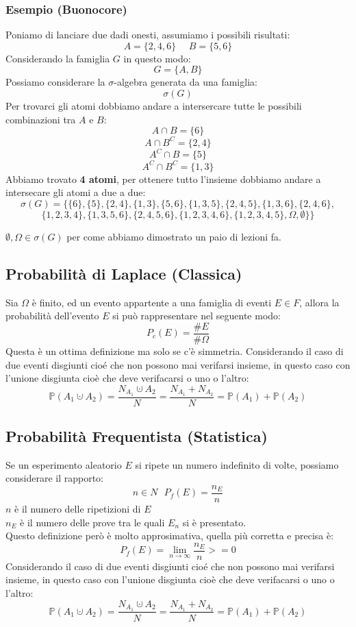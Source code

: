 \subsubsection{Esempio (Buonocore)}
Poniamo di lanciare due dadi onesti, assumiamo i possibili risultati:
$$ A = \{2,4,6\} \:\:\:\:\:\: B=\{5,6\}$$
Considerando la famiglia $G$ in questo modo:
$$ G = \{A,B\}$$
Possiamo considerare la $\sigma$-algebra generata da una famiglia:
$$ \sigma(G)$$
Per trovarci gli atomi dobbiamo andare a intersercare tutte le possibili combinazioni tra $A$ e $B$:\\
$$ A \cap B = \{6\}$$
$$ A \cap B^C = \{2,4\}$$
$$ A^C \cap B = \{5\}$$
$$ A^C \cap B^C = \{1,3\}$$
Abbiamo trovato \textbf{4 atomi}, per ottenere tutto l'insieme dobbiamo andare a intersecare gli atomi a due a due:
$$ \sigma(G) = \{ \{6\},  \{5\}, \{2,4\},  \{1,3\}, \{5,6\}, \{1,3,5\}, \{2,4,5\}, \{1,3,6\}, \{2,4,6\}, $$ 
$$ \{1,2,3,4\}, \{1,3,5,6\}, \{2,4,5,6\}, \{1,2,3,4,6\}, \{1,2,3,4,5\}, \Omega, \emptyset \}\}  $$
\begin{center}
$ \emptyset,\Omega \in \sigma(G)$ per come abbiamo dimostrato un paio di lezioni fa.
\end{center}

\subsection{Probabilità di Laplace (Classica)}
Sia $\Omega$ è finito, ed un evento appartente a una famiglia di eventi $E \in F$, allora la probabilità dell'evento $E$ si può rappresentare nel seguente modo:
$$ P_c(E) = \frac{\#E}{\#\Omega} $$
Questa è un ottima definizione ma solo se c'è simmetria.
Considerando il caso di due eventi disgiunti cioé che non possono mai verifarsi insieme, in questo caso con l'unione disgiunta cioè che deve verifacarsi o uno o l'altro:
$$ \mathbb{P}(A_1 \cupdot A_2) = \frac{N_{A_1} \cupdot A_2}{N} = \frac{N_{A_1}+N_{A_2}}{N} = \mathbb{P}(A_1)+\mathbb{P}(A_2)$$

\subsection{Probabilità Frequentista (Statistica)}
Se un esperimento aleatorio $E$ si ripete un numero indefinito di volte, possiamo considerare il rapporto:
$$ n \in N \:\:\: P_f(E) = \frac{n_E}{n}$$
$n$ è il numero delle ripetizioni di $E$\\
$n_E$ è il numero delle prove tra le quali $E_n$ si è presentato.\\
Questo definizione però è molto approsimativa, quella più corretta e precisa è:\\
 \[ P_f(E) = \lim_{n\to\infty} \frac{n_E}{n} >= 0 \]
Considerando il caso di due eventi disgiunti cioé che non possono mai verifarsi insieme, in questo caso con l'unione disgiunta cioè che deve verifacarsi o uno o l'altro:
$$ \mathbb{P}(A_1 \cupdot A_2) = \frac{N_{A_1} \cupdot A_2}{N} = \frac{N_{A_1}+N_{A_2}}{N} = \mathbb{P}(A_1)+\mathbb{P}(A_2)$$






